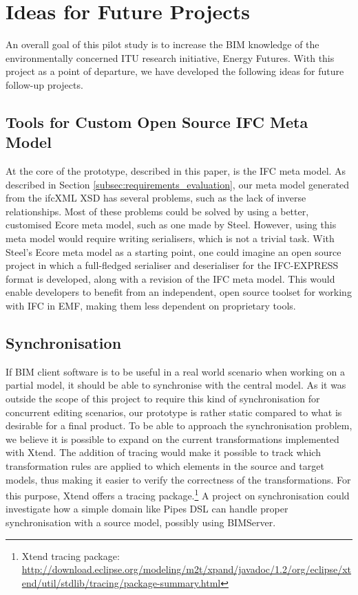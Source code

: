 
\section{Ideas for Future Projects}
\label{sec:plan_for_future_projects}
An overall goal of this pilot study is to increase the BIM knowledge of the environmentally concerned ITU research initiative, Energy Futures. With this project as a point of departure, we have developed the following ideas for future follow-up projects.

\subsection{Tools for Custom Open Source IFC Meta Model}
At the core of the prototype, described in this paper, is the IFC meta model. As described in Section \ref{subsec:requirements_evaluation}, our meta model generated from the ifcXML XSD has several problems, such as the lack of inverse relationships. Most of these problems could be solved by using a better, customised Ecore meta model, such as one made by Steel. However, using this meta model would require writing serialisers, which is not a trivial task. With Steel's Ecore meta model as a starting point, one could imagine an open source project in which a full-fledged serialiser and deserialiser for the IFC-EXPRESS format is developed, along with a revision of the IFC meta model. This would enable developers to benefit from an independent, open source toolset for working with IFC in EMF, making them less dependent on proprietary tools.

\subsection{Synchronisation}
If BIM client software is to be useful in a real world scenario when working on a partial model, it should be able to synchronise with the central model. As it was outside the scope of this project to require this kind of synchronisation for concurrent editing scenarios, our prototype is rather static compared to what is desirable for a final product. To be able to approach the synchronisation problem, we believe it is possible to expand on the current transformations implemented with Xtend. The addition of tracing would make it possible to track which transformation rules are applied to which elements in the source and target models, thus making it easier to verify the correctness of the transformations. For this purpose, Xtend offers a tracing package.\footnote{Xtend tracing package: \url{http://download.eclipse.org/modeling/m2t/xpand/javadoc/1.2/org/eclipse/xtend/util/stdlib/tracing/package-summary.html}} A project on synchronisation could investigate how a simple domain like Pipes DSL can handle proper synchronisation with a source model, possibly using BIMServer.

